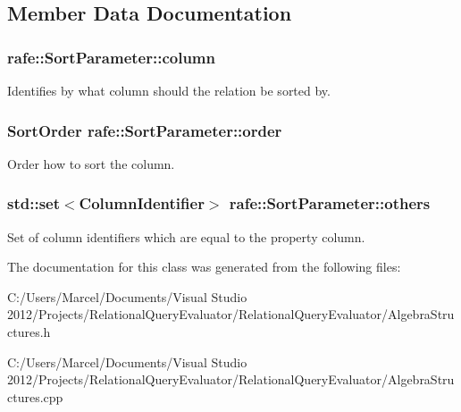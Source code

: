 \subsection{Member Data Documentation}
\hypertarget{classrafe_1_1_sort_parameter_ab28a61edbd40e46e55fac81024e5cdf8}{
\subsubsection[{column}]{ rafe\+::\+Sort\+Parameter\+::column}}\label{classrafe_1_1_sort_parameter_ab28a61edbd40e46e55fac81024e5cdf8}
Identifies by what column should the relation be sorted by. \hypertarget{classrafe_1_1_sort_parameter_ac4bb3225464a463206abfc4ef7a4a875}{
\subsubsection[{order}]{\setlength{\rightskip}{0pt plus 5cm}Sort\+Order rafe\+::\+Sort\+Parameter\+::order}}\label{classrafe_1_1_sort_parameter_ac4bb3225464a463206abfc4ef7a4a875}
Order how to sort the column. \hypertarget{classrafe_1_1_sort_parameter_ae8a1dda682edec1b98e928590763ba85}{
\subsubsection[{others}]{\setlength{\rightskip}{0pt plus 5cm}std\+::set$<${\bf Column\+Identifier}$>$ rafe\+::\+Sort\+Parameter\+::others}}\label{classrafe_1_1_sort_parameter_ae8a1dda682edec1b98e928590763ba85}
Set of column identifiers which are equal to the property column. 

The documentation for this class was generated from the following files\+:\begin{DoxyCompactItemize}
\item 
C\+:/\+Users/\+Marcel/\+Documents/\+Visual Studio 2012/\+Projects/\+Relational\+Query\+Evaluator/\+Relational\+Query\+Evaluator/Algebra\+Structures.\+h\item 
C\+:/\+Users/\+Marcel/\+Documents/\+Visual Studio 2012/\+Projects/\+Relational\+Query\+Evaluator/\+Relational\+Query\+Evaluator/Algebra\+Structures.\+cpp\end{DoxyCompactItemize}
